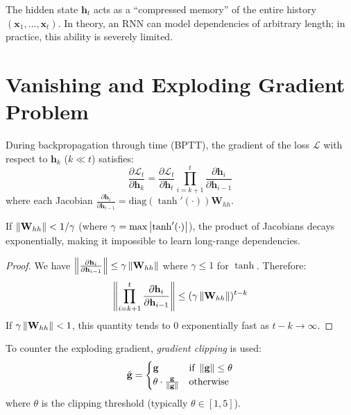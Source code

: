 \begin{remark}
The hidden state $\mathbf{h}_t$ acts as a ``compressed memory'' of the entire
history $(\mathbf{x}_1, \ldots, \mathbf{x}_t)$. In theory, an RNN can model
dependencies of arbitrary length; in practice, this ability is severely limited.
\end{remark}

\section{Vanishing and Exploding Gradient Problem}
\label{sec:seq:gradient}

\begin{theorem}
During backpropagation through time (BPTT), the gradient of the loss
$\mathcal{L}$ with respect to $\mathbf{h}_k$ ($k \ll t$) satisfies:
\[
\frac{\partial \mathcal{L}_t}{\partial \mathbf{h}_k} = \frac{\partial \mathcal{L}_t}{\partial \mathbf{h}_t} \prod_{i=k+1}^{t} \frac{\partial \mathbf{h}_i}{\partial \mathbf{h}_{i-1}}
\]
where each Jacobian $\frac{\partial \mathbf{h}_i}{\partial \mathbf{h}_{i-1}} = \text{diag}(\tanh'(\cdot)) \mathbf{W}_{hh}$.

If $\left\| \mathbf{W}_{hh} \right\| < 1 / \gamma$ (where $\gamma = \max \left| \tanh'(\cdot) \right|$),
the product of Jacobians decays exponentially, making it impossible to learn
long-range dependencies.
\end{theorem}

\begin{proof}
We have $\left\| \frac{\partial \mathbf{h}_i}{\partial \mathbf{h}_{i-1}} \right\| \leq \gamma \left\| \mathbf{W}_{hh} \right\|$
where $\gamma \leq 1$ for $\tanh$. Therefore:
\[
\left\| \prod_{i=k+1}^{t} \frac{\partial \mathbf{h}_i}{\partial \mathbf{h}_{i-1}} \right\| \leq (\gamma \left\| \mathbf{W}_{hh} \right\|)^{t-k}
\]
If $\gamma \left\| \mathbf{W}_{hh} \right\| < 1$, this quantity tends to $0$
exponentially fast as $t - k \to \infty$.
\end{proof}

\begin{keyformulas}[title=\textbf{Gradient clipping}]
To counter the exploding gradient, \emph{gradient clipping} is used:
\[
\hat{\mathbf{g}} = \begin{cases}
\mathbf{g} & \text{if } \left\| \mathbf{g} \right\| \leq \theta \\
\theta \cdot \frac{\mathbf{g}}{\left\| \mathbf{g} \right\|} & \text{otherwise}
\end{cases}
\]
where $\theta$ is the clipping threshold (typically $\theta \in [1, 5]$).
\end{keyformulas}

